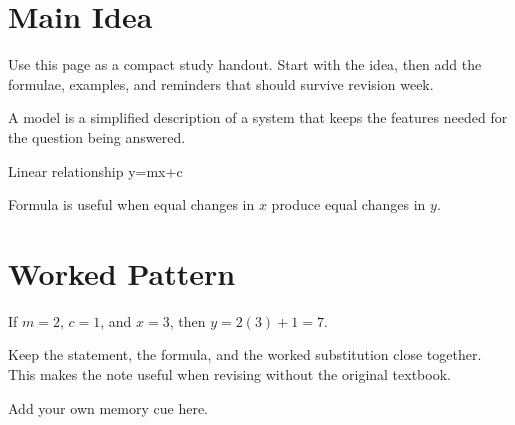 \documentclass{studentnotes}
\begin{document}
\makenotetitle
\tableofcontents
\newpage

\section{Main Idea}

Use this page as a compact study handout. Start with the idea, then add the
formulae, examples, and reminders that should survive revision week.

\begin{definition}
  A model is a simplified description of a system that keeps the features needed
  for the question being answered.
\end{definition}

\begin{namedformula}{Linear relationship}
  \label{formula:linear-relationship}
  y=mx+c
\end{namedformula}

\begin{quicknote}
  Formula  is useful when equal changes
  in \(x\) produce equal changes in \(y\).
\end{quicknote}

\section{Worked Pattern}

\begin{example}
  If \(m=2\), \(c=1\), and \(x=3\), then \(y=2(3)+1=7\).
\end{example}

\begin{importantnote}
  Keep the statement, the formula, and the worked substitution close together.
  This makes the note useful when revising without the original textbook.
\end{importantnote}

\begin{personalnote}
  Add your own memory cue here.
\end{personalnote}

\end{document}
